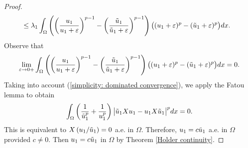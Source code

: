 \documentclass[a4paper,12pt,reqno]{amsart}
\renewcommand\eqref[1]{(\ref{#1})} %
\numberwithin{equation}{section}
\theoremstyle{plain}
\theoremstyle{definition}
\begin{document}
\begin{proof}
\begin{equation*}
\begin{aligned}
& \leq\lambda_{1} \int_{\Omega}\left(\left(\frac{u_{1}}{u_{1}+\varepsilon}\right)^{p-1}-\left(\frac{\Tilde{u}_{1}}{\Tilde{u}_{1}+\varepsilon}\right)^{p-1}\right)\big((u_{1}+\varepsilon)^{p}-(\Tilde{u}_{1}+\varepsilon)^{p}\big) d x.
\end{aligned}    
\end{equation*}
Observe that  
\begin{equation}\label{simplicity: dominated convergence}
\lim _{\varepsilon \rightarrow 0+} \int_{\Omega}\left(\left(\frac{u_{1}}{u_{1}+\varepsilon}\right)^{p-1}-\left(\frac{\Tilde{u}_{1}}{\Tilde{u}_{1}+\varepsilon}\right)^{p-1}\right)\big((u_{1}+\varepsilon)^{p}-(\Tilde{u}_{1}+\varepsilon)^{p}\big) d x=0    .
\end{equation}
Taking into account \eqref{simplicity: dominated convergence}, we apply the Fatou lemma to obtain
\begin{equation*}
\int_{\Omega}\left(\frac{1}{\Tilde{u}_{1}^{p}}+\frac{1}{u_{1}^{p}}\right)\big|\Tilde{u}_{1} X u_{1}-u_{1} X \Tilde{u}_{1}\big|^{p} d x=0.    
\end{equation*}
This is equivalent to  $X\left(u_{1}/\Tilde{u}_{1}\right)=0$ a.e. in $\Omega$.  Therefore,  $u_{1}=c\Tilde{u}_{1}$ a.e. in $\Omega$ provided $c\neq 0$. Then $u_{1}=c\Tilde{u}_{1}$ in $\Omega$ by Theorem \ref{Holder continuity}.


\end{proof}
\end{document}
